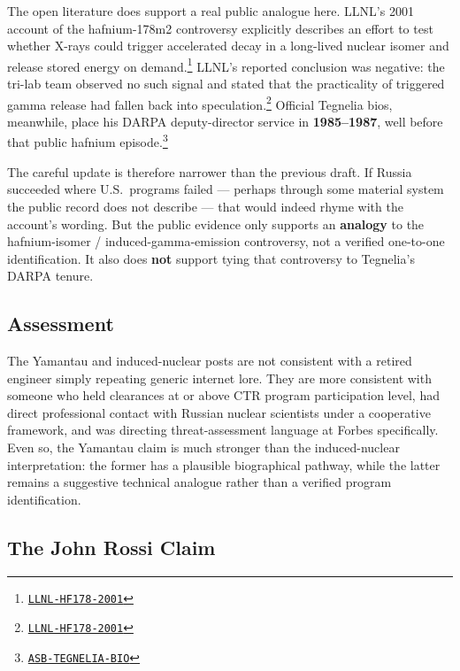 \documentclass[11pt]{article}
\newcommand{\src}[2]{\href{#1}{\texttt{#2}}}
\begin{document}
The open literature does support a real public analogue here. LLNL's 2001 account of the hafnium-178m2 controversy explicitly describes an effort to test whether X-rays could trigger accelerated decay in a long-lived nuclear isomer and release stored energy on demand.\footnote{\src{https://www.llnl.gov/article/28056/physicists-challenge-reports-accelerated-decay-nuclear-excited-state}{LLNL-HF178-2001}} LLNL's reported conclusion was negative: the tri-lab team observed no such signal and stated that the practicality of triggered gamma release had fallen back into speculation.\footnote{\src{https://www.llnl.gov/article/28056/physicists-challenge-reports-accelerated-decay-nuclear-excited-state}{LLNL-HF178-2001}} Official Tegnelia bios, meanwhile, place his DARPA deputy-director service in \textbf{1985--1987}, well before that public hafnium episode.\footnote{\src{https://asb.army.mil/Portals/105/Biography\%20Books/2013\_ASB\_Bio\_Book\%20130614.pdf}{ASB-TEGNELIA-BIO}}

The careful update is therefore narrower than the previous draft. If Russia succeeded where U.S.\ programs failed --- perhaps through some material system the public record does not describe --- that would indeed rhyme with the account's wording. But the public evidence only supports an \textbf{analogy} to the hafnium-isomer / induced-gamma-emission controversy, not a verified one-to-one identification. It also does \textbf{not} support tying that controversy to Tegnelia's DARPA tenure.

\subsection{Assessment}

The Yamantau and induced-nuclear posts are not consistent with a retired engineer simply repeating generic internet lore. They are more consistent with someone who held clearances at or above CTR program participation level, had direct professional contact with Russian nuclear scientists under a cooperative framework, and was directing threat-assessment language at Forbes specifically. Even so, the Yamantau claim is much stronger than the induced-nuclear interpretation: the former has a plausible biographical pathway, while the latter remains a suggestive technical analogue rather than a verified program identification.

\subsection{The John Rossi Claim}
\end{document}
